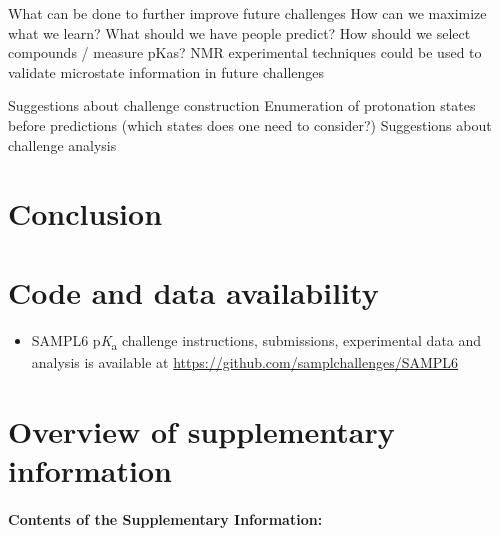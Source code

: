\documentclass[9pt,lineno,final]{elife}
\newcommand{\pKa}{p\textit{K}\textsubscript{a}}
\begin{document}
What can be done to further improve future challenges
How can we maximize what we learn?
What should we have people predict?
How should we select compounds / measure pKas? NMR experimental techniques could be used to validate microstate information in future challenges

Suggestions about challenge construction
Enumeration of protonation states before predictions (which states does one need to consider?)
Suggestions about challenge analysis
















\section{Conclusion}


\section{Code and data availability}
\begin{minipage}{15cm}
\begin{itemize}

\item SAMPL6 \pKa{} challenge instructions, submissions, experimental data and analysis is available at  \href{https://github.com/samplchallenges/SAMPL6}{https://github.com/samplchallenges/SAMPL6}

\end{itemize}
\end{minipage}


\section{Overview of supplementary information}

\paragraph{Contents of the Supplementary Information:}
\end{document}

